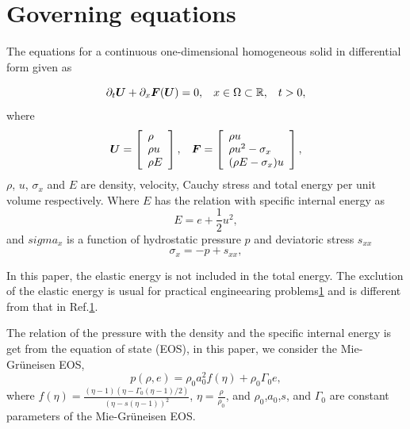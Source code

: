 \documentclass{article}
\numberwithin{equation}{section}
\numberwithin{table}{section}
\begin{document}
\section{Governing equations} 

The equations for a continuous one-dimensional homogeneous solid in differential form given as

\begin{equation}
  \partial_t \bm{U} +\partial _x \bm{F}(\bm{U}) = 0, \hspace{0.3cm} x\in \Omega \subset \mathbb{R}, \hspace{0.3cm} t>0,
\end{equation}
where
\begin{equation}
  \bm{U} = \left[ \begin{array}{l}
	  \rho \\
	  \rho u \\
	  \rho  E \\
	\end{array}
  \right],
  \hspace{0.3cm} 
  \bm{F} = \left[ \begin{array}{l}
	  \rho u \\
	  \rho u^2 -\sigma_x\\
	  (\rho E -\sigma_x)u\\
  \end{array} \right],
\end{equation}
$\rho$, $u$, $\sigma_x$ and $E$ are  density, velocity, Cauchy stress and total energy per unit volume respectively. Where $E$ has the relation with specific internal energy as
\begin{equation}
  E = e+\frac{1}{2}u^2,
\end{equation}
and $sigma_x$ is a function of hydrostatic pressure $p$ and deviatoric stress $s_{xx}$
\begin{equation}
  \sigma_x = -p +s_{xx},
\end{equation}

In this paper, the elastic energy is not included in the total energy. The exclution of the elastic energy is usual for practical engineearing problems\ref{} and is different from that in Ref.\ref{}.

The relation of  the pressure with  the density and the specific internal energy is get from the  equation of state (EOS), in this paper, we consider the Mie-Gr\"uneisen EOS,
\begin{equation}\label{eq:mie}
  p(\rho,e) = \rho_0 a_0^2f(\eta)+ \rho_0 \Gamma_0 e,
\end{equation}
where $f(\eta) = \frac{(\eta-1)(\eta-\Gamma_0(\eta-1)/2)}{(\eta-s(\eta-1))^2}$, $\eta = \frac{\rho}{\rho_0}$, and $\rho_0$,$a_0$,$s$, and $\Gamma_0$ are constant parameters of the Mie-Gr\"uneisen EOS.
\end{document}
